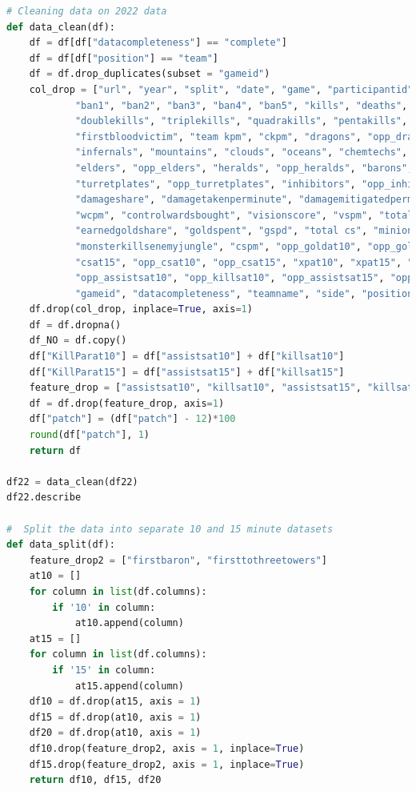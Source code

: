 \begin{lstlisting}[language=python,label={lst:pythoncode}]
# Cleaning data on 2022 data
def data_clean(df):
    df = df[df["datacompleteness"] == "complete"]
    df = df[df["position"] == "team"]
    df = df.drop_duplicates(subset = "gameid")
    col_drop = ["url", "year", "split", "date", "game", "participantid", "playername", "playerid", "teamid", "champion",
            "ban1", "ban2", "ban3", "ban4", "ban5", "kills", "deaths", "assists", "teamkills", "teamdeaths",
            "doublekills", "triplekills", "quadrakills", "pentakills", "firstbloodkill", "firstbloodassist",
            "firstbloodvictim", "team kpm", "ckpm", "dragons", "opp_dragons", "elementaldrakes", "opp_elementaldrakes",
            "infernals", "mountains", "clouds", "oceans", "chemtechs", "hextechs", "dragons (type unknown)",
            "elders", "opp_elders", "heralds", "opp_heralds", "barons", "opp_barons", "towers", "opp_towers",
            "turretplates", "opp_turretplates", "inhibitors", "opp_inhibitors", "damagetochampions", "dpm",
            "damageshare", "damagetakenperminute", "damagemitigatedperminute", "wardsplaced", "wpm", "wardskilled",
            "wcpm", "controlwardsbought", "visionscore", "vspm", "totalgold", "earnedgold", "earned gpm",
            "earnedgoldshare", "goldspent", "gspd", "total cs", "minionkills", "monsterkills", "monsterkillsownjungle",
            "monsterkillsenemyjungle", "cspm", "opp_goldat10", "opp_goldat15", "goldat10", "goldat15", "csat10",
            "csat15", "opp_csat10", "opp_csat15", "xpat10", "xpat15", "opp_xpat10", "opp_xpat15", "league",
            "opp_assistsat10", "opp_killsat10", "opp_assistsat15", "opp_killsat15", "opp_deathsat10", "opp_deathsat15",
            "gameid", "datacompleteness", "teamname", "side", "position",]
    df.drop(col_drop, inplace=True, axis=1)
    df = df.dropna()
    df_NO = df.copy()
    df["KillParat10"] = df["assistsat10"] + df["killsat10"]
    df["KillParat15"] = df["assistsat15"] + df["killsat15"]
    feature_drop = ["assistsat10", "killsat10", "assistsat15", "killsat15", "golddiffat10", "golddiffat15", "xpdiffat10", "xpdiffat15"]
    df = df.drop(feature_drop, axis=1)
    df["patch"] = (df["patch"] - 12)*100
    round(df["patch"], 1)
    return df

df22 = data_clean(df22)
df22.describe

#  Split the data into separate 10 and 15 minute datasets
def data_split(df):
    feature_drop2 = ["firstbaron", "firsttothreetowers"]
    at10 = []
    for column in list(df.columns):
        if '10' in column:
            at10.append(column)
    at15 = []
    for column in list(df.columns):
        if '15' in column:
            at15.append(column)
    df10 = df.drop(at15, axis = 1)
    df15 = df.drop(at10, axis = 1)
    df20 = df.drop(at10, axis = 1)
    df10.drop(feature_drop2, axis = 1, inplace=True)
    df15.drop(feature_drop2, axis = 1, inplace=True)
    return df10, df15, df20


\end{lstlisting}
